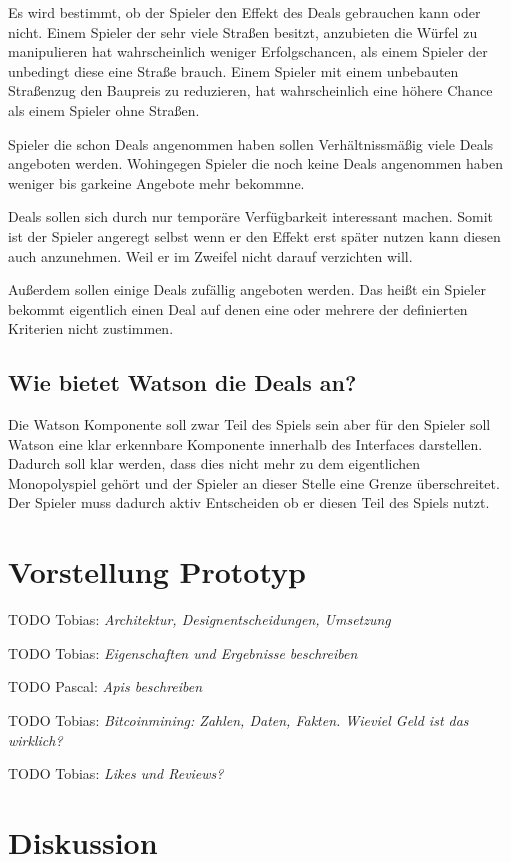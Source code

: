 \documentclass[german]{cgspaper} %
\newcommand{\todo}[1]{\textit{#1}}
\newcommand{\Pascal}[1]{\textcolor{colorPascal}{TODO Pascal:} \todo{#1} }
\newcommand{\Tobias}[1]{\textcolor{colorTobias}{TODO Tobias:} \todo{#1} }
\begin{document}
Es wird bestimmt, ob der Spieler den Effekt des Deals gebrauchen kann oder nicht. 
Einem Spieler der sehr viele Straßen besitzt, anzubieten die Würfel zu manipulieren hat wahrscheinlich weniger Erfolgschancen, als einem Spieler der unbedingt diese eine Straße brauch.
Einem Spieler mit einem unbebauten Straßenzug den Baupreis zu reduzieren, hat wahrscheinlich eine höhere Chance als einem Spieler ohne Straßen.

Spieler die schon Deals angenommen haben sollen Verhältnissmäßig viele Deals angeboten werden.
Wohingegen Spieler die noch keine Deals angenommen haben weniger bis garkeine Angebote mehr bekommne.

Deals sollen sich durch nur temporäre Verfügbarkeit interessant machen.
Somit ist der Spieler angeregt selbst wenn er den Effekt erst später nutzen kann diesen auch anzunehmen.
Weil er im Zweifel nicht darauf verzichten will.

Außerdem sollen einige Deals zufällig angeboten werden.
Das heißt ein Spieler bekommt eigentlich einen Deal auf denen eine oder mehrere der definierten Kriterien nicht zustimmen.

\subsection{Wie bietet Watson die Deals an?}

Die Watson Komponente soll zwar Teil des Spiels sein aber für den Spieler soll Watson eine klar erkennbare Komponente innerhalb des Interfaces darstellen.
Dadurch soll klar werden, dass dies nicht mehr zu dem eigentlichen Monopolyspiel gehört und der Spieler an dieser Stelle eine Grenze überschreitet.
Der Spieler muss dadurch aktiv Entscheiden ob er diesen Teil des Spiels nutzt.

\section{Vorstellung Prototyp}

\Tobias{Architektur, Designentscheidungen, Umsetzung}

\Tobias{Eigenschaften und Ergebnisse beschreiben}

\Pascal{Apis beschreiben}

\Tobias{Bitcoinmining: Zahlen, Daten, Fakten. Wieviel Geld ist das wirklich?}

\Tobias{Likes und Reviews?}

\section{Diskussion}
\end{document}

